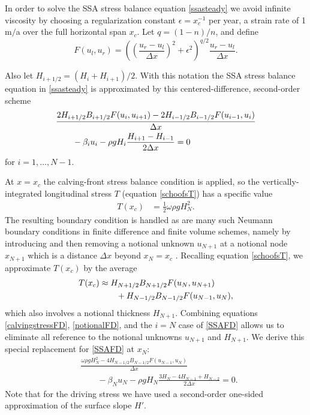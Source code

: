 \documentclass[twocolumn,letterpaper]{igs}
\newcommand{\eps}{\epsilon}
\begin{document}
In order to solve the SSA stress balance equation \eqref{ssasteady} we avoid infinite viscosity by choosing a regularization constant $\eps=x_c^{-1}$ per year, a strain rate of 1 m$/$a over the full horizontal span $x_c$.  Let $q = (1-n)/n$, and define
\begin{equation}
F(u_l,u_r) = \left(\left(\frac{u_r-u_l}{\Delta x}\right)^2 + \eps^2\right)^{q/2} \frac{u_r-u_l}{\Delta x}.  \label{viscregFD}
\end{equation}

Also let $H_{i+1/2} = (H_i+H_{i+1})/2$.  With this notation the SSA stress balance equation in \eqref{ssasteady} is approximated by this centered-difference, second-order scheme
\begin{align}
&\frac{2 H_{i+1/2} B_{i+1/2} F(u_i,u_{i+1}) - 2 H_{i-1/2} B_{i-1/2} F(u_{i-1},u_i)}{\Delta x} \notag \\
&\qquad - \beta_i u_i - \rho g H_i \frac{H_{i+1}-H_{i-1}}{2\Delta x} = 0  \label{SSAFD}
\end{align}
for $i=1,\dots,N-1$.

At $x=x_c$ the calving-front stress balance condition is applied, so the vertically-integrated longitudinal stress $T$ (equation \eqref{schoofsT}) has a specific value
\begin{align}
T(x_c) &= \frac{1}{2} \omega \rho g H_N^2. \label{calvingstressFD}
\end{align}
The resulting boundary condition is handled as are many such Neumann boundary conditions in finite difference and finite volume schemes, namely by introducing and then removing a notional unknown $u_{N+1}$ at a notional node $x_{N+1}$ which is a distance $\Delta x$ beyond $x_N=x_c$ \citep{MortonMayers}.  Recalling equation \eqref{schoofsT}, we approximate $T(x_c)$ by the average
\begin{align}
T(x_c) &\approx H_{N+1/2} B_{N+1/2} F(u_N,u_{N+1}) \notag \\
  &\qquad+ H_{N-1/2} B_{N-1/2} F(u_{N-1},u_{N}),\label{notionalFD}
\end{align}
which also involves a notional thickness $H_{N+1}$.  Combining equations \eqref{calvingstressFD}, \eqref{notionalFD}, and the $i=N$ case of \eqref{SSAFD} allows us to eliminate all reference to the notional unknowns $u_{N+1}$ and $H_{N+1}$.  We derive this special replacement for \eqref{SSAFD} at $x_N$:
\begin{align*}
&\frac{\omega \rho g H_N^2 - 4 H_{N-1/2} B_{N-1/2} F(u_{N-1},u_N)}{\Delta x} \\
&\qquad - \beta_N u_N - \rho g H_N \frac{3 H_N - 4H_{N-1} + H_{N-2}}{2\Delta x} = 0.
\end{align*}
Note that for the driving stress we have used a second-order one-sided approximation of the surface slope $H'$.
\end{document}
